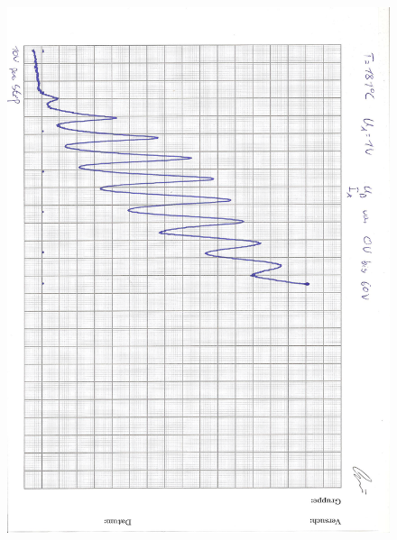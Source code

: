 \begin{figure}[H]
    \centering
    \includegraphics[height=25cm]{"Franck-Hertz Kurve"}
\end{figure}

